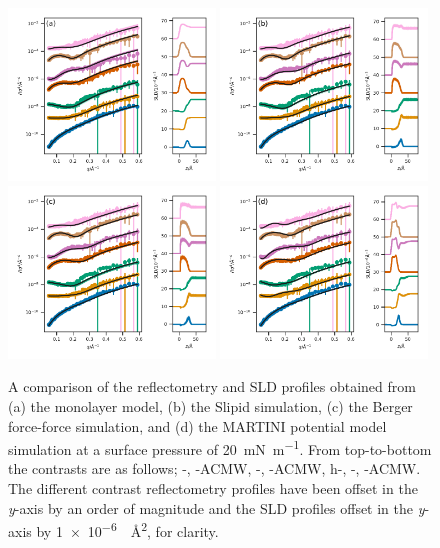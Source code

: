 \documentclass[amsmath,amssymb,superscriptaddress]{revtex4-1}
\begin{document}
%
\begin{figure}
 \centering
 \includegraphics[width=0.49\textwidth]{dspc_20_ref_sld}
 \includegraphics[width=0.49\textwidth]{dspc_slipids_20_ref_sld} \\
 \includegraphics[width=0.49\textwidth]{dspc_berger_20_ref_sld}
 \includegraphics[width=0.49\textwidth]{dspc_martini_20_ref_sld}
 \caption{A comparison of the reflectometry and SLD profiles obtained from (a) the monolayer model, (b) the Slipid simulation, (c) the Berger force-force simulation, and (d) the MARTINI potential model simulation at a surface pressure of \SI{20}{\milli\newton\per\meter}. From top-to-bottom the contrasts are as follows; -, -ACMW, -, -ACMW, h-, -, -ACMW. The different contrast reflectometry profiles have been offset in the \emph{y}-axis by an order of magnitude and the SLD profiles offset in the \emph{y}-axis by \SI{1e-6}{\per\square\angstrom}, for clarity.}
 \label{fig:sp20}
\end{figure}
\end{document}
